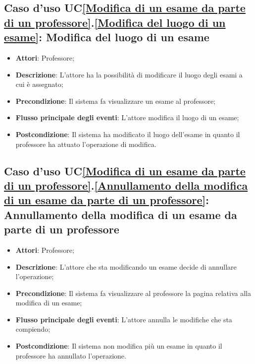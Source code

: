 \subsection{Caso d'uso UC\ref{Modifica di un esame da parte di un professore}.\ref{Modifica del luogo di un esame}: Modifica del luogo di un esame}
\begin{itemize}
	\item \textbf{Attori}: Professore;
	\item \textbf{Descrizione}: L'attore ha la possibilità di modificare il luogo degli esami a cui è assegnato;
	\item \textbf{Precondizione}: Il sistema fa visualizzare un esame al professore;
	
	\item \textbf{Flusso principale degli eventi}: L'attore modifica il luogo di un esame;
	\item \textbf{Postcondizione}: Il sistema ha modificato il luogo dell'esame in quanto il professore ha attuato l'operazione di modifica.
	
\end{itemize}

\subsection{Caso d'uso UC\ref{Modifica di un esame da parte di un professore}.\ref{Annullamento della modifica di un esame da parte di un professore}: Annullamento della modifica di un esame da parte di un professore}
\begin{itemize}
	\item \textbf{Attori}: Professore;
	\item \textbf{Descrizione}: L'attore che sta modificando un esame decide di annullare l'operazione;
	\item \textbf{Precondizione}: Il sistema fa visualizzare al professore la pagina relativa alla modifica di un esame;
	
	\item \textbf{Flusso principale degli eventi}: L'attore annulla le modifiche che sta compiendo;
	\item \textbf{Postcondizione}: Il sistema non modifica più un esame in quanto il professore ha annullato l'operazione.
	
\end{itemize}

